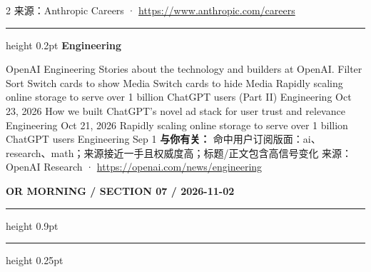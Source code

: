 \documentclass[10.5pt]{ctexart}
\begin{document}
\begin{multicols}{2}
{\footnotesize\color{ormuted} 来源：Anthropic Careers · \url{https://www.anthropic.com/careers}}
\vspace{2mm}
\hrule height 0.2pt
\vspace{2mm}
{\large\bfseries Engineering}\par
OpenAI Engineering Stories about the technology and builders at OpenAI. Filter Sort Switch cards to show Media Switch cards to hide Media Rapidly scaling online storage to serve over 1 billion ChatGPT users (Part II) Engineering Oct 23, 2026 How we built ChatGPT’s novel ad stack for user trust and relevance Engineering Oct 21, 2026 Rapidly scaling online storage to serve over 1 billion ChatGPT users Engineering Sep 1
\textbf{与你有关：} 命中用户订阅版面：ai、research、math；来源接近一手且权威度高；标题/正文包含高信号变化
{\footnotesize\color{ormuted} 来源：OpenAI Research · \url{https://openai.com/news/engineering}}
\end{multicols}
\newpage
{\small\bfseries OR MORNING / SECTION 07 / 2026-11-02}
\vspace{2mm}
\hrule height 0.9pt
\vspace{1.5mm}
\hrule height 0.25pt
\vspace{4mm}
\end{document}
